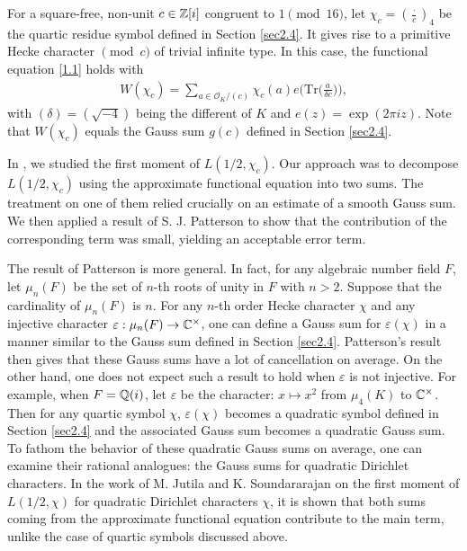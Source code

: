 \documentclass[twoside,leqno,10pt, A4]{amsart}
\begin{document}
   For a square-free, non-unit $c \in \mathbb{Z}[i]$ congruent to $1 \pmod {16}$, let $\chi_c=(\frac {\cdot}{c})_4$ be the quartic
residue symbol defined in Section \ref{sec2.4}. It gives rise to a primitive Hecke character $\pmod {c}$ of trivial infinite type.
In this case, the functional equation \eqref{1.1} holds with
\begin{align*}
   W(\chi_c)=\sum_{a \in \mathcal{O}_{K}/(c)}\chi_c(a)e\Big ( \text{Tr}\Big (\frac {a}{\delta c}\Big )\Big ),
\end{align*}
   with $(\delta)=(\sqrt{-4})$ being the different of $K$ and $e(z) = \exp( 2 \pi i z)$. Note that
   $W(\chi_c)$ equals the Gauss sum  $g(c)$ defined in
   Section \ref{sec2.4}. \newline

In \cite{G&Zhao1}, we studied the first moment of  $L(1/2,\chi_c)$.  Our approach was to decompose $L(1/2, \chi_c)$ using the approximate functional equation into two sums.  The treatment on one of them relied crucially on an estimate of a smooth Gauss sum. We then applied a result of S. J. Patterson  \cite[Lemma, p. 200]{P} to show that the contribution of the corresponding term was small, yielding an acceptable error term. \newline

   The result of Patterson is more general. In fact, for any algebraic number field $F$, let $\mu_n(F)$ be the set of $n$-th roots of unity in $F$ with $n>2$. Suppose that the cardinality of $\mu_n(F)$ is $n$. For any $n$-th order Hecke character $\chi$ and any injective character $\varepsilon: \mu_n(F) \rightarrow \mathbb C^{\times}$, one can define a Gauss sum for $\varepsilon(\chi)$ in a manner similar to the Gauss sum defined in
   Section \ref{sec2.4}.  Patterson's result then gives that these Gauss sums have a lot of cancellation on average. On the other hand, one does not expect such a result to hold when $\varepsilon$ is not injective. For example, when $F =\mathbb Q(i)$, let $\varepsilon$ be the character: $x \mapsto x^2$ from $\mu_4(K)$ to $\mathbb C^{\times}$. Then for any quartic symbol $\chi$, $\varepsilon(\chi)$ becomes a quadratic symbol defined in Section \ref{sec2.4} and the associated Gauss sum becomes a quadratic Gauss sum. To fathom the behavior of these quadratic Gauss sums on average, one can examine their rational analogues: the Gauss sums for quadratic Dirichlet characters. In the work of M. Jutila \cite{Jutila} and K. Soundararajan \cite{sound1} on the first moment of  $L(1/2,\chi)$ for quadratic Dirichlet characters $\chi$, it is shown that both sums coming from the approximate functional equation contribute to the main term, unlike the case of quartic symbols discussed above. \newline
\end{document}
